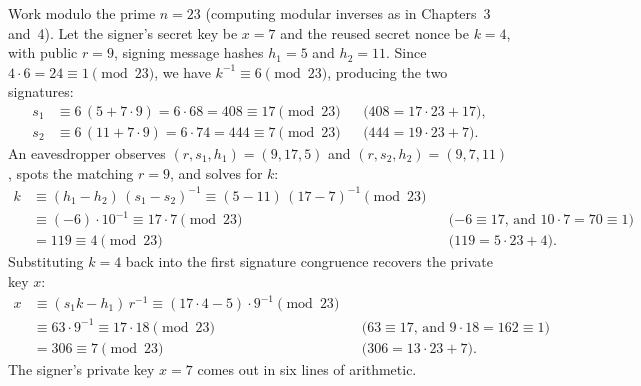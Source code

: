 \begin{example}
\label{ch17:nonce-tiny}
Work modulo the prime $n = 23$ (computing modular inverses as in Chapters~3 and~4). Let the signer's secret key be $x = 7$ and the reused secret nonce be $k = 4$, with public $r = 9$, signing message hashes $h_1 = 5$ and $h_2 = 11$. Since $4 \cdot 6 = 24 \equiv 1 \pmod{23}$, we have $k^{-1} \equiv 6 \pmod{23}$, producing the two signatures:
\begin{align*}
  s_1 &\equiv 6\,(5 + 7 \cdot 9) = 6 \cdot 68 = 408 \equiv 17 \pmod{23} && \text{($408 = 17 \cdot 23 + 17$)}, \\
  s_2 &\equiv 6\,(11 + 7 \cdot 9) = 6 \cdot 74 = 444 \equiv 7 \pmod{23} && \text{($444 = 19 \cdot 23 + 7$)}.
\end{align*}
An eavesdropper observes $(r, s_1, h_1) = (9, 17, 5)$ and $(r, s_2, h_2) = (9, 7, 11)$, spots the matching $r = 9$, and solves for $k$:
\begin{align*}
  k &\equiv (h_1 - h_2)\,(s_1 - s_2)^{-1} \equiv (5 - 11)\,(17 - 7)^{-1} \pmod{23} \\
    &\equiv (-6)\cdot 10^{-1} \equiv 17 \cdot 7 \pmod{23} && \text{($-6 \equiv 17$, and $10 \cdot 7 = 70 \equiv 1$)} \\
    &= 119 \equiv 4 \pmod{23} && \text{($119 = 5 \cdot 23 + 4$)}.
\end{align*}
Substituting $k = 4$ back into the first signature congruence recovers the private key $x$:
\begin{align*}
  x &\equiv (s_1 k - h_1)\,r^{-1} \equiv (17 \cdot 4 - 5)\cdot 9^{-1} \pmod{23} \\
    &\equiv 63 \cdot 9^{-1} \equiv 17 \cdot 18 \pmod{23} && \text{($63 \equiv 17$, and $9 \cdot 18 = 162 \equiv 1$)} \\
    &= 306 \equiv 7 \pmod{23} && \text{($306 = 13 \cdot 23 + 7$)}.
\end{align*}
The signer's private key $x = 7$ comes out in six lines of arithmetic.
\end{example}

